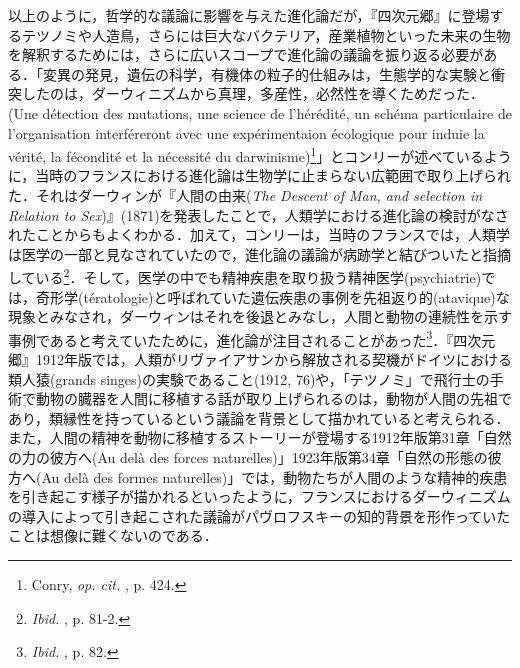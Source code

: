 以上のように，哲学的な議論に影響を与えた進化論だが，『四次元郷』に登場するテツノミや人造鳥，さらには巨大なバクテリア，産業植物といった未来の生物を解釈するためには，さらに広いスコープで進化論の議論を振り返る必要がある．「変異の発見，遺伝の科学，有機体の粒子的仕組みは，生態学的な実験と衝突したのは，ダーウィニズムから真理，多産性，必然性を導くためだった．(Une détection des mutations, une science de l'hérédité, un schéma particulaire de l'organisation interféreront avec une expérimentaion écologique pour induie la vérité, la fécondité et la nécessité du darwinisme)\footnote{Conry, \emph{op. cit. }, p. 424.}」とコンリーが述べているように，当時のフランスにおける進化論は生物学に止まらない広範囲で取り上げられた．それはダーウィンが『人間の由来(\emph{The Descent of Man, and selection in Relation to Sex})』(1871)を発表したことで，人類学における進化論の検討がなされたことからもよくわかる．加えて，コンリーは，当時のフランスでは，人類学は医学の一部と見なされていたので，進化論の議論が病跡学と結びついたと指摘している\footnote{\emph{Ibid.} , p. 81-2.}．そして，医学の中でも精神疾患を取り扱う精神医学(psychiatrie)では，奇形学(tératologie)と呼ばれていた遺伝疾患の事例を先祖返り的(atavique)な現象とみなされ，ダーウィンはそれを後退とみなし，人間と動物の連続性を示す事例であると考えていたために，進化論が注目されることがあった\footnote{\emph{Ibid. }, p. 82.}．『四次元郷』1912年版では，人類がリヴァイアサンから解放される契機がドイツにおける類人猿(grands singes)の実験であること(1912, 76)や，「テツノミ」で飛行士の手術で動物の臓器を人間に移植する話が取り上げられるのは，動物が人間の先祖であり，類縁性を持っているという議論を背景として描かれていると考えられる．また，人間の精神を動物に移植するストーリーが登場する1912年版第31章「自然の力の彼方へ(Au delà des forces naturelles)」1923年版第34章「自然の形態の彼方へ(Au delà des formes naturelles)」では，動物たちが人間のような精神的疾患を引き起こす様子が描かれるといったように，フランスにおけるダーウィニズムの導入によって引き起こされた議論がパヴロフスキーの知的背景を形作っていたことは想像に難くないのである．

